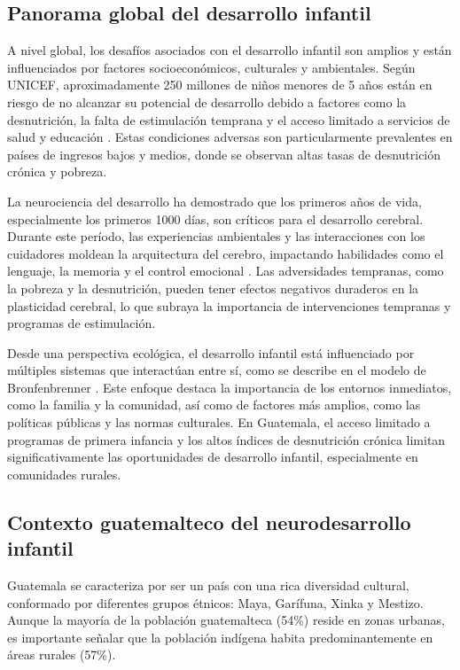 \documentclass[11pt,letterpaper]{report}
\begin{document}
\subsection{Panorama global del desarrollo infantil}
A nivel global,  los desafíos asociados con el desarrollo infantil son amplios
y están influenciados por factores socioeconómicos, culturales y ambientales.
Según UNICEF, aproximadamente 250 millones de niños menores de 5 años están en 
riesgo de no alcanzar su potencial de desarrollo debido a factores como la 
desnutrición, la falta de estimulación temprana y el acceso limitado a 
servicios de salud y educación \cite{UNICEF2023}. Estas condiciones adversas 
son particularmente prevalentes en países de ingresos bajos y medios, donde se 
observan altas tasas de desnutrición crónica y pobreza.

La neurociencia del desarrollo ha demostrado que los primeros años de vida, 
especialmente los primeros 1000 días, son críticos para el desarrollo cerebral. 
Durante este período, las experiencias ambientales y las interacciones con los 
cuidadores moldean la arquitectura del cerebro, impactando habilidades como el 
lenguaje, la memoria y el control emocional \cite{Stiles2010}. Las adversidades 
tempranas, como la pobreza y la desnutrición, pueden tener efectos negativos 
duraderos en la plasticidad cerebral, lo que subraya la importancia de 
intervenciones tempranas y programas de estimulación.

Desde una perspectiva ecológica, el desarrollo infantil está influenciado por 
múltiples sistemas que interactúan entre sí, como se describe en el modelo de 
Bronfenbrenner \cite{Bronfenbrenner2005}. Este enfoque destaca la importancia 
de los entornos inmediatos, como la familia y la comunidad, así como de 
factores más amplios, como las políticas públicas y las normas culturales. En
Guatemala, el acceso limitado a programas de primera infancia y los altos
índices de desnutrición crónica limitan significativamente las oportunidades de
desarrollo infantil, especialmente en comunidades rurales. \cite{SESAN2022}

\subsection{Contexto guatemalteco del neurodesarrollo infantil}
Guatemala se caracteriza por ser un país con una rica diversidad cultural,
conformado por diferentes grupos étnicos: Maya, Garífuna, Xinka y Mestizo. 
Aunque la mayoría de la población guatemalteca (54\%) reside en zonas urbanas,
es importante señalar que la población indígena habita predominantemente en
áreas rurales (57\%). \cite{PoliticaInfanciaGuate}
\end{document}

